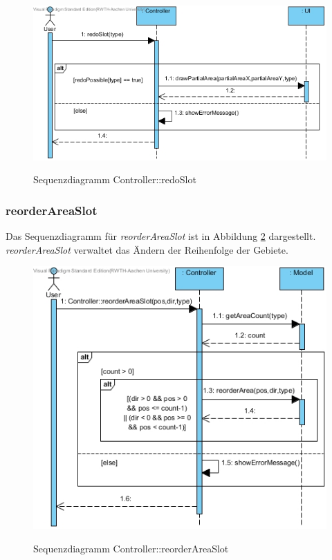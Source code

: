 \begin{figure}[H]
	\centering
	\includegraphics[scale=.7]{Bilder/Controller__redoSlot().jpg}\\
	\caption{Sequenzdiagramm Controller::redoSlot}
	\label{Sequenzdiagramm Controller::redoSlot}
\end{figure}

\subsubsection*{reorderAreaSlot}

Das Sequenzdiagramm für \emph{reorderAreaSlot} ist in Abbildung \ref{Sequenzdiagramm Controller::reorderAreaSlot} dargestellt. \emph{reorderAreaSlot} verwaltet das Ändern der Reihenfolge der Gebiete.

\begin{figure}[H]
	\centering
	\includegraphics[scale=.7]{Bilder/Controller__reorderAreaSlot().jpg}\\
	\caption{Sequenzdiagramm Controller::reorderAreaSlot}
	\label{Sequenzdiagramm Controller::reorderAreaSlot}
\end{figure}
\newpage
